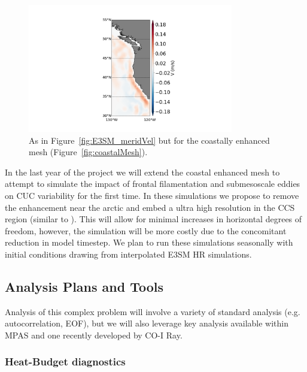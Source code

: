 \begin{figure}[h]
  \centering
  \includegraphics[width=0.8\textwidth]{meridionalVelocity_300m_CONUS_aug.png}
  \caption{As in Figure~\ref{fig:E3SM_meridVel} but for the coastally enhanced mesh (Figure~\ref{fig:coastalMesh}).}
  \label{fig:E3SM_CONUS_meridVel}
\end{figure}

In the last year of the project we will extend the coastal enhanced mesh to attempt to simulate the impact of frontal filamentation and submesoscale eddies \citep{capet2008mesoscale} on CUC variability for the first time.  In these simulations we propose to remove the enhancement near the arctic and embed a ultra high resolution in the CCS region (similar to \citep{lorenzo2004modelling}).  This will allow for minimal increases in horizontal degrees of freedom, however, the simulation will be more costly due to the concomitant reduction in model timestep.  We plan to run these simulations seasonally with initial conditions drawing from interpolated E3SM HR simulations.

\subsection{Analysis Plans and Tools}
 
 Analysis of this complex problem will involve a variety of standard analysis (e.g. autocorrelation, EOF), but we will also leverage key analysis available within MPAS and one recently developed by CO-I Ray.
 
\subsubsection {Heat-Budget diagnostics}
\label{sec:heatBudget}

